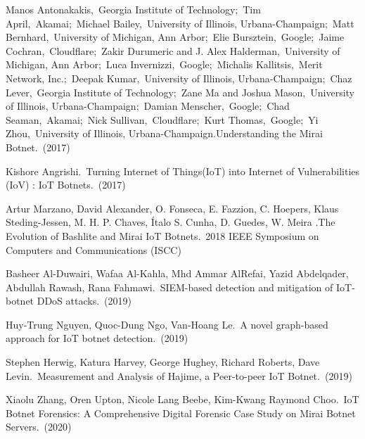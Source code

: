 \documentclass[conference]{IEEEtran}
\begin{document}
\begin{thebibliography}{00}
Manos Antonakakis, Georgia Institute of Technology; Tim April, Akamai; Michael Bailey, University of Illinois, Urbana-Champaign; Matt Bernhard, University of Michigan, Ann Arbor; Elie Bursztein, Google; Jaime Cochran, Cloudflare; Zakir Durumeric and J. Alex Halderman, University of Michigan, Ann Arbor; Luca Invernizzi, Google; Michalis Kallitsis, Merit Network, Inc.; Deepak Kumar, University of Illinois, Urbana-Champaign; Chaz Lever, Georgia Institute of Technology; Zane Ma and Joshua Mason, University of Illinois, Urbana-Champaign; Damian Menscher, Google; Chad Seaman, Akamai; Nick Sullivan, Cloudflare; Kurt Thomas, Google; Yi Zhou, University of Illinois, Urbana-Champaign.Understanding the Mirai Botnet. (2017)

 Kishore Angrishi. Turning Internet of Things(IoT) into Internet of Vulnerabilities (IoV) : IoT Botnets. (2017)

 Artur Marzano, David Alexander, O. Fonseca, E. Fazzion, C. Hoepers, Klaus Steding-Jessen, M. H. P. Chaves, Ítalo S. Cunha, D. Guedes, W. Meira .The Evolution of Bashlite and Mirai IoT Botnets. 2018 IEEE Symposium on Computers and Communications (ISCC) 

Basheer Al-Duwairi, Wafaa Al-Kahla, Mhd Ammar AlRefai, Yazid Abdelqader, Abdullah Rawash, Rana Fahmawi. SIEM-based detection and mitigation of IoT-botnet DDoS attacks. (2019) 

Huy-Trung Nguyen, Quoc-Dung Ngo, Van-Hoang Le. A novel graph-based approach for IoT botnet detection. (2019) 

Stephen Herwig, Katura Harvey, George Hughey, Richard Roberts, Dave Levin. Measurement and Analysis of Hajime, a Peer-to-peer IoT Botnet. (2019) 

Xiaolu Zhang, Oren Upton, Nicole Lang Beebe, Kim-Kwang Raymond Choo. IoT Botnet Forensics: A Comprehensive Digital Forensic Case Study on Mirai Botnet Servers. (2020) 


\end{thebibliography}
\end{document}
